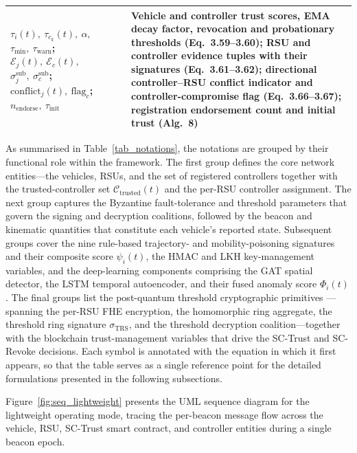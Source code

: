 \documentclass[12pt, a4paper]{report}
\begin{document}
\begin{longtable}{|m{3.6cm}|m{9.0cm}|}
\hline
$\tau_i(t),\ \tau_{c_k}(t),\ \alpha,$\newline
$\tau_{\min},\ \tau_{\text{warn}}$;\newline
$\mathcal{E}_j(t),\ \mathcal{E}_c(t),$\newline
$\sigma_j^{\text{sub}},\ \sigma_c^{\text{sub}}$;\newline
$\text{conflict}_j(t),\ \text{flag}_c$;\newline
$n_{\text{endorse}},\ \tau_{\text{init}}$ &
Vehicle and controller trust scores, EMA decay factor, revocation and probationary thresholds (Eq.~3.59--3.60); RSU and controller evidence tuples with their signatures (Eq.~3.61--3.62); directional controller--RSU conflict indicator and controller-compromise flag (Eq.~3.66--3.67); registration endorsement count and initial trust (Alg.~8) \\
\hline

\end{longtable}
\normalsize

As summarised in Table~\ref{tab_notations}, the notations are grouped
by their functional role within the framework. The first group defines
the core network entities---the vehicles, RSUs, and the set of
registered controllers together with the trusted-controller set
$\mathcal{C}_{\text{trusted}}(t)$ and the per-RSU controller
assignment. The next group captures the Byzantine fault-tolerance and
threshold parameters that govern the signing and decryption coalitions,
followed by the beacon and kinematic quantities that constitute each
vehicle's reported state. Subsequent groups cover the nine rule-based
trajectory- and mobility-poisoning signatures and their composite score
$\psi_i(t)$, the HMAC and LKH key-management variables, and the
deep-learning components comprising the GAT spatial detector, the LSTM
temporal autoencoder, and their fused anomaly score $\Phi_i(t)$. The
final groups list the post-quantum threshold cryptographic primitives
---spanning the per-RSU FHE encryption, the homomorphic ring aggregate,
the threshold ring signature $\sigma_{\text{TRS}}$, and the threshold
decryption coalition---together with the blockchain trust-management
variables that drive the SC-Trust and SC-Revoke decisions. Each symbol
is annotated with the equation in which it first appears, so that the
table serves as a single reference point for the detailed formulations
presented in the following subsections.

Figure~\ref{fig:seq_lightweight} presents the UML sequence diagram for the lightweight operating mode, tracing the per-beacon message flow across the vehicle, RSU, SC-Trust smart contract, and controller entities during a single beacon epoch.
\end{document}
